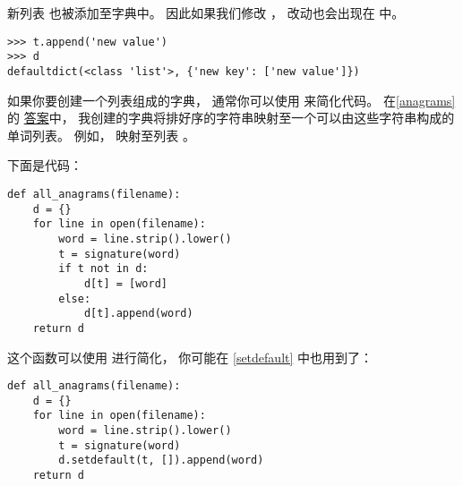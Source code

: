 新列表  也被添加至字典中。  
因此如果我们修改  ， 改动也会出现在  中。

\begin{lstlisting}
>>> t.append('new value')
>>> d
defaultdict(<class 'list'>, {'new key': ['new value']})
\end{lstlisting}


如果你要创建一个列表组成的字典， 通常你可以使用  来简化代码。  
在\ref{anagrams} 的 \href{http://thinkpython2.com/code/anagram_sets.py}{答案}中， 我创建的字典将排好序的字符串映射至一个可以由这些字符串构成的单词列表。  
例如， 映射至列表 。


下面是代码：

\begin{lstlisting}
def all_anagrams(filename):
    d = {}
    for line in open(filename):
        word = line.strip().lower()
        t = signature(word)
        if t not in d:
            d[t] = [word]
        else:
            d[t].append(word)
    return d
\end{lstlisting}


这个函数可以使用  进行简化， 你可能在 \ref{setdefault} 中也用到了：

\begin{lstlisting}
def all_anagrams(filename):
    d = {}
    for line in open(filename):
        word = line.strip().lower()
        t = signature(word)
        d.setdefault(t, []).append(word)
    return d
\end{lstlisting}


